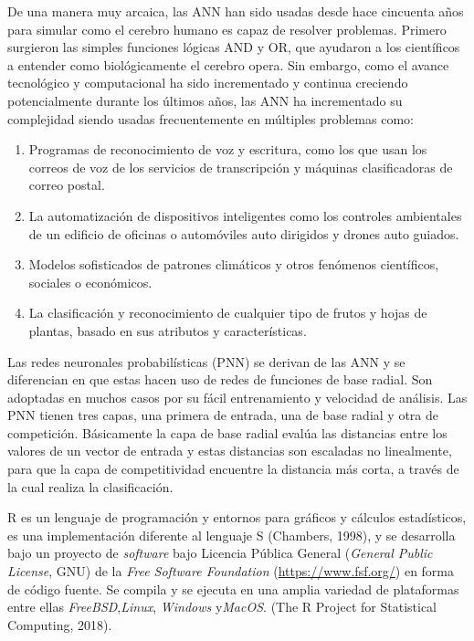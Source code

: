 De una manera muy arcaica, las ANN han sido usadas desde hace cincuenta años para simular como el cerebro humano es capaz de resolver problemas. Primero surgieron las simples funciones lógicas AND y OR, que ayudaron a los científicos a entender como biológicamente el cerebro opera. Sin embargo, como el avance tecnológico y computacional ha sido incrementado y continua creciendo potencialmente durante los últimos años, las ANN ha incrementado su complejidad siendo usadas frecuentemente en múltiples problemas como:

\begin{enumerate}
    \item{Programas de reconocimiento de voz y escritura, como los que usan los correos de voz
de los servicios de transcripción y máquinas clasificadoras de correo postal.}
	\item{La automatización de dispositivos inteligentes como los controles ambientales de un edificio de oficinas o automóviles auto dirigidos y drones auto guiados.}
	\item{Modelos sofisticados de patrones climáticos y otros fenómenos científicos, sociales o económicos.}
	\item{La clasificación y reconocimiento de cualquier tipo de frutos y hojas de plantas, basado en sus atributos y características.}
\end{enumerate} 

Las redes neuronales probabilísticas (PNN) se derivan de las ANN y se diferencian en que estas hacen uso de redes de funciones de base radial. Son adoptadas en muchos casos por su fácil entrenamiento y velocidad de análisis. Las PNN tienen tres capas, una primera de entrada, una de base radial y otra de competición. Básicamente la capa de base radial evalúa las distancias entre los valores de un vector de entrada y estas distancias son escaladas no linealmente, para que la capa de competitividad encuentre la distancia más corta, a través de la cual realiza la clasificación.

R es un lenguaje de programación y entornos para gráficos y cálculos estadísticos, es una implementación diferente al lenguaje S (Chambers, 1998), y se desarrolla bajo un proyecto de \textit{software} bajo Licencia Pública General (\textit{General Public License}, GNU) de la \textit{Free Software Foundation} (\url{https://www.fsf.org/}) en forma de código fuente. Se compila y se ejecuta en una amplia variedad de plataformas entre ellas \textit{FreeBSD},\textit{Linux}, \textit{Windows} y\textit{MacOS}. (The R Project for Statistical Computing, 2018).\\

